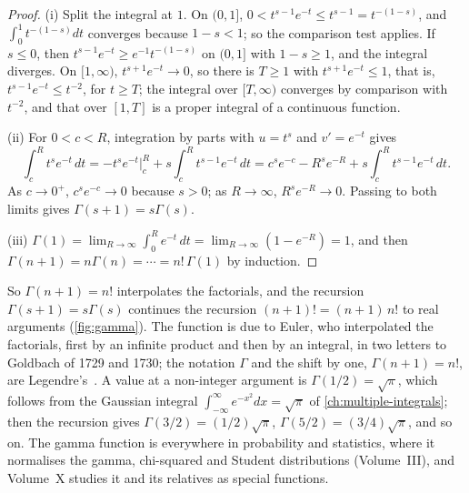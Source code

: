 \begin{proof}
(i) Split the integral at $1$. On $(0,1]$, $0<t^{s-1}e^{-t}\le t^{s-1}=t^{-(1-s)}$, and $\int_0^1t^{-(1-s)}dt$ converges because $1-s<1$; so the comparison test applies. If $s\le0$, then $t^{s-1}e^{-t}\ge e^{-1}t^{-(1-s)}$ on $(0,1]$ with $1-s\ge1$, and the integral diverges. On $[1,\infty)$, $t^{s+1}e^{-t}\to0$, so there is $T\ge1$ with $t^{s+1}e^{-t}\le1$, that is, $t^{s-1}e^{-t}\le t^{-2}$, for $t\ge T$; the integral over $[T,\infty)$ converges by comparison with $t^{-2}$, and that over $[1,T]$ is a proper integral of a continuous function.

(ii) For $0<c<R$, integration by parts with $u=t^s$ and $v'=e^{-t}$ gives
\[
\int_c^Rt^se^{-t}\,dt=-t^se^{-t}\Big|_c^R+s\int_c^Rt^{s-1}e^{-t}\,dt=c^se^{-c}-R^se^{-R}+s\int_c^Rt^{s-1}e^{-t}\,dt .
\]
As $c\to0^+$, $c^se^{-c}\to0$ because $s>0$; as $R\to\infty$, $R^se^{-R}\to0$. Passing to both limits gives $\Gamma(s+1)=s\Gamma(s)$.

(iii) $\Gamma(1)=\lim_{R\to\infty}\int_0^Re^{-t}\,dt=\lim_{R\to\infty}(1-e^{-R})=1$, and then $\Gamma(n+1)=n\Gamma(n)=\cdots=n!\,\Gamma(1)$ by induction.
\end{proof}

So $\Gamma(n+1)=n!$ interpolates the factorials, and the recursion $\Gamma(s+1)=s\Gamma(s)$ continues the recursion $(n+1)!=(n+1)\,n!$ to real arguments (\cref{fig:gamma}). The function is due to Euler, who interpolated the factorials, first by an infinite product and then by an integral, in two letters to Goldbach of 1729 and 1730; the notation $\Gamma$ and the shift by one, $\Gamma(n+1)=n!$, are Legendre's~\cite{davis1959gamma}. A value at a non-integer argument is $\Gamma(1/2)=\sqrt\pi$, which follows from the Gaussian integral $\int_{-\infty}^\infty e^{-x^2}dx=\sqrt\pi$ of \cref{ch:multiple-integrals}; then the recursion gives $\Gamma(3/2)=(1/2)\sqrt\pi$, $\Gamma(5/2)=(3/4)\sqrt\pi$, and so on. The gamma function is everywhere in probability and statistics, where it normalises the gamma, chi-squared and Student distributions (Volume~III), and Volume~X studies it and its relatives as special functions.

